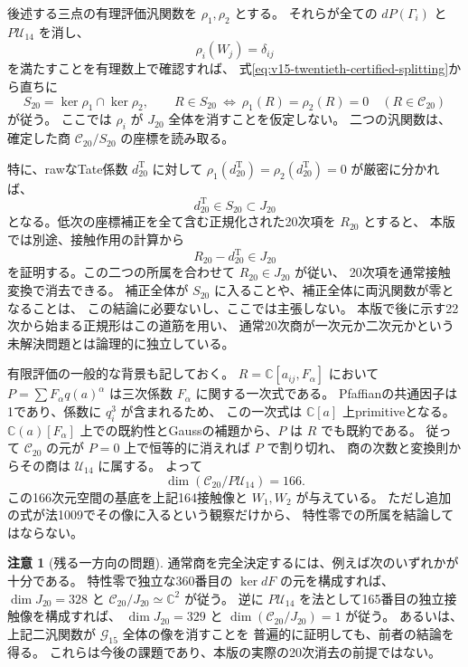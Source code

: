 \documentclass[a4paper,11pt]{ltjsarticle}
\theoremstyle{definition}
\newtheorem{remark}[theorem]{注意}
\newcommand{\CC}{\mathbb C}
\begin{document}
後述する三点の有理評価汎関数を $\rho_1,\rho_2$ とする。
それらが全ての $dP(\Gamma_i)$ と $P\mathcal U_{14}$ を消し、
\[
                  \rho_i(W_j)=\delta_{ij}
\]
を満たすことを有理数上で確認すれば、
式\eqref{eq:v15-twentieth-certified-splitting}から直ちに
\[
 S_{20}=\ker\rho_1\cap\ker\rho_2,\qquad
 R\in S_{20}\ \Longleftrightarrow\
       \rho_1(R)=\rho_2(R)=0\quad(R\in\mathcal C_{20})
 \tag{20rho}\label{eq:v15-twentieth-subspace-detection}
\]
が従う。
ここでは $\rho_i$ が $J_{20}$ 全体を消すことを仮定しない。
二つの汎関数は、確定した商 $\mathcal C_{20}/S_{20}$ の座標を読み取る。

特に、rawなTate係数 $d_{20}^{\mathrm T}$ に対して
$\rho_1(d_{20}^{\mathrm T})=\rho_2(d_{20}^{\mathrm T})=0$ が厳密に分かれば、
\[
                    d_{20}^{\mathrm T}\in S_{20}\subset J_{20}
\]
となる。低次の座標補正を全て含む正規化された20次項を $R_{20}$ とすると、
本版では別途、接触作用の計算から
\[
                         R_{20}-d_{20}^{\mathrm T}\in J_{20}
\]
を証明する。この二つの所属を合わせて $R_{20}\in J_{20}$ が従い、
20次項を通常接触変換で消去できる。
補正全体が $S_{20}$ に入ることや、補正全体に両汎関数が零となることは、
この結論に必要ないし、ここでは主張しない。
本版で後に示す22次から始まる正規形はこの道筋を用い、
通常20次商が一次元か二次元かという未解決問題とは論理的に独立している。

有限評価の一般的な背景も記しておく。
$R=\CC[a_{ij},F_\alpha]$ において
$P=\sum F_\alpha q(a)^\alpha$ は三次係数 $F_\alpha$ に関する一次式である。
Pfaffianの共通因子は1であり、係数に $q_i^3$ が含まれるため、
この一次式は $\CC[a]$ 上primitiveとなる。
$\CC(a)[F_\alpha]$ 上での既約性とGaussの補題から、$P$ は $R$ でも既約である。
従って $\mathcal C_{20}$ の元が $P=0$ 上で恒等的に消えれば $P$ で割り切れ、
商の次数と変換則からその商は $\mathcal U_{14}$ に属する。
よって
\[
                       \dim(\mathcal C_{20}/P\mathcal U_{14})=166.
\]
この166次元空間の基底を上記164接触像と $W_1,W_2$ が与えている。
ただし追加の式が法1009でその像に入るという観察だけから、
特性零での所属を結論してはならない。

\begin{remark}[残る一方向の問題]
通常商を完全決定するには、例えば次のいずれかが十分である。
特性零で独立な360番目の $\ker dF$ の元を構成すれば、
$\dim J_{20}=328$ と $\mathcal C_{20}/J_{20}\simeq\CC^2$ が従う。
逆に $P\mathcal U_{14}$ を法として165番目の独立接触像を構成すれば、
$\dim J_{20}=329$ と $\dim(\mathcal C_{20}/J_{20})=1$ が従う。
あるいは、上記二汎関数が $\mathcal G_{15}$ 全体の像を消すことを
普遍的に証明しても、前者の結論を得る。
これらは今後の課題であり、本版の実際の20次消去の前提ではない。
\end{remark}
\end{document}
